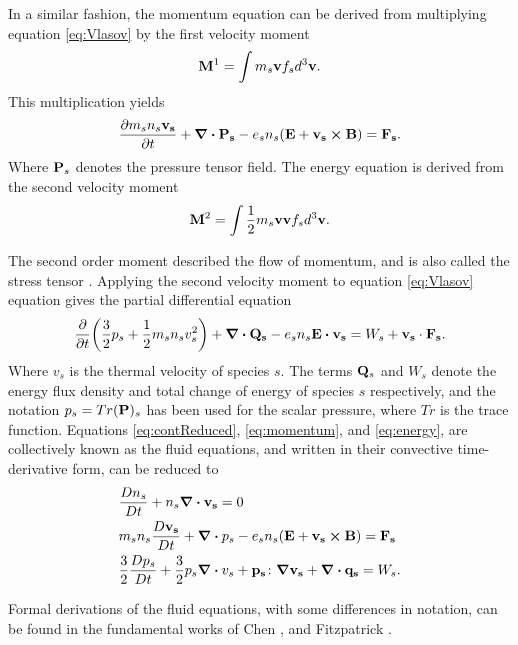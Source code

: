 In a similar fashion, the momentum equation can be derived from multiplying equation \eqref{eq:Vlasov} by the first velocity moment
\begin{equation}\label{eq:firstmoment}
    \vb{M}^1 = \int m_s \vb{v} f_s d^3 \vb{v}.
\end{equation}
This multiplication yields
\begin{equation}\label{eq:momentum}
     \pdv{m_s n_s \vb{v_s}}{t} + \div{\vb{P_s}} - e_s n_s (\vb{E} + \vb{v_s} \cross \vb{B}) = \vb{F_s}.
\end{equation}
Where $\vb{P}_s$ denotes the pressure tensor field. The energy equation is derived from the second velocity moment
\begin{equation}
    \vb{M}^2 = \int \frac{1}{2} m_s \vb{v} \vb{v} f_s d^3 \vb{v}.
\end{equation}

The second order moment described the flow of momentum, and is also called the stress tensor \parencite[Ch. 3]{Fitzpatrick2015}. Applying the second velocity moment to equation \eqref{eq:Vlasov} equation gives the partial differential equation
\begin{equation}\label{eq:energy}
    \pdv{t} (\frac{3}{2} p_s + \frac{1}{2} m_s n_s v_s^2) + \div{\vb{Q_s}} - e_s n_s \vb{E} \vdot \vb{v_s} = W_s + \vb{v_s} \cdot \vb{F_s}.   
\end{equation}
Where $v_s$ is the thermal velocity of species $s$. The terms $\vb{Q}_s$ and ${W}_s$ denote the energy flux density and total change of energy of species $s$ respectively, and the notation $p_s = Tr(\vb{P})_s$ has been used for the scalar pressure, where $Tr$ is the trace function. Equations \eqref{eq:contReduced}, \eqref{eq:momentum}, and \eqref{eq:energy}, are collectively known as the fluid equations, and written in their convective time-derivative form, can be reduced to
\begin{subequations}
    \begin{align}
        &\frac{D n_s}{D t} + n_s \div{\vb{v_s}} = 0 \\
        &m_s n_s \frac{D \vb{v_s}}{D t} + \div{p_s} - e_s n_s ( \vb{E} + \vb{v_s} \cross \vb{B}) = \vb{F_s} \\
        &\frac{3}{2} \frac{D p_s}{D t} + \frac{3}{2} p_s \div{v_s} + \vb{p_s} \colon \grad{\vb{v_s}} + \div{\vb{q_s}} = W_s.
    \end{align}
\end{subequations}

Formal derivations of the fluid equations, with some differences in notation, can be found in the fundamental works of Chen \parencite{Chen2018}, and Fitzpatrick \parencite{Fitzpatrick2015}.

